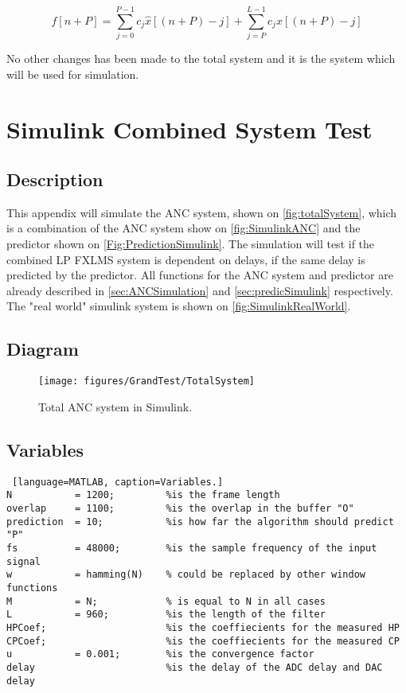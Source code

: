\begin{equation}\label{eq:CPExpandedapp}
f[n+P]=\sum^{P-1}_{j=0}c_j\hat{x}[(n+P)-j]+\sum^{L-1}_{j=P}c_jx[(n+P)-j]
\end{equation}

No other changes has been made to the total system and it is the system which will be used for simulation.

\newpage
\section{Simulink Combined System Test} \label{sec:SimulinkTotalSystem}

\subsection{Description}
This appendix will simulate the ANC system, shown on \autoref{fig:totalSystem}, which is a combination of the ANC system show on \autoref{fig:SimulinkANC} and the predictor shown on \autoref{Fig:PredictionSimulink}. The simulation will test if the combined LP FXLMS system is dependent on delays, if the same delay is predicted by the predictor. All functions for the ANC system and predictor are already described in \autoref{sec:ANCSimulation} and \autoref{sec:predicSimulink} respectively. The "real world" simulink system is shown on \autoref{fig:SimulinkRealWorld}.

\subsection{Diagram}
\begin{figure}[H]
	\centering
	\texttt{[image: figures/GrandTest/TotalSystem]}
	\caption{Total ANC system in Simulink.}
	\label{fig:SimulinktotalSystem}
\end{figure}

\pagebreak
\subsection{Variables}
\begin{lstlisting} [language=MATLAB, caption=Variables.]
N 			= 1200; 		%is the frame length 
overlap 	= 1100;			%is the overlap in the buffer "O"
prediction 	= 10; 			%is how far the algorithm should predict "P"
fs 			= 48000; 		%is the sample frequency of the input signal 
w           = hamming(N)	% could be replaced by other window functions
M           = N;			% is equal to N in all cases
L  			= 960;  	 	%is the length of the filter
HPCoef;  		 			%is the coeffiecients for the measured HP
CPCoef;  		 			%is the coeffiecients for the measured CP
u  			= 0.001;		%is the convergence factor
delay 			 			%is the delay of the ADC delay and DAC delay
\end{lstlisting}


